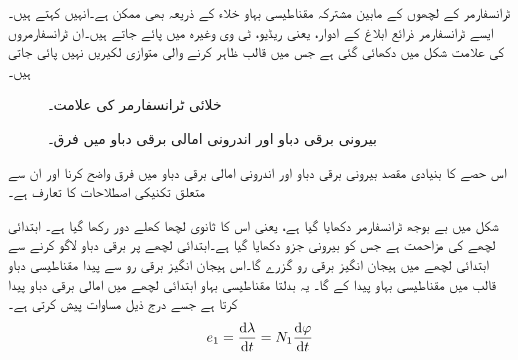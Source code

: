 ٹرانسفارمر کے لچھوں کے مابین مشترکہ مقناطیسی بہاو خلاء کے ذریعہ بھی ممکن ہے۔انہیں   کہتے ہیں۔ ایسے ٹرانسفارمر ذرائع ابلاغ کے ادوار، یعنی ریڈیو، ٹی وی وغیرہ میں پائے جاتے ہیں۔ان ٹرانسفارمروں کی علامت  شکل  میں دکھائی گئی ہے  جس میں  قالب ظاہر کرنے والی متوازی لکیریں نہیں پائی جاتی ہیں۔
\begin{figure}
\centering
\begin{minipage}{0.30\textwidth}
\centering
{}
\caption{خلائی ٹرانسفارمر کی علامت۔}
\label{شکل_ٹرانسفارمر_خلائی_قالب_علامت}
\end{minipage}%
\begin{minipage}{0.60\textwidth}
\centering
\caption{بیرونی برقی دباو اور اندرونی امالی برقی دباو میں فرق۔}
\label{شکل_ٹرانسفارمر_بیرونی_اور_اندرونی_برقی_دباو}
\end{minipage}
\end{figure}


اس حصے کا بنیادی مقصد بیرونی برقی دباو   اور اندرونی امالی برقی دباو   میں فرق واضح کرنا اور ان سے متعلق  تکنیکی اصطلاحات کا تعارف  ہے۔

شکل   میں بے بوجھ ٹرانسفارمر دکھایا گیا ہے، یعنی اس کا ثانوی لچھا  کھلے دور رکھا گیا ہے۔ ابتدائی لچھے کی مزاحمت  ہے جس کو بیرونی جزو دکھایا گیا ہے۔ابتدائی لچھے پر  برقی دباو لاگو کرنے سے ابتدائی لچھے میں ہیجان انگیز برقی رو  گزرے گا۔اس ہیجان انگیز برقی رو سے پیدا مقناطیسی دباو   قالب میں مقناطیسی بہاو   پیدا کے گا۔ یہ بدلتا مقناطیسی بہاو ابتدائی لچھے میں امالی برقی  دباو   پیدا کرتا ہے جسے درج ذیل مساوات پیش کرتی ہے۔
\begin{align}
e_1=\frac{\dif \lambda}{\dif t}=N_1 \frac{\dif \varphi}{\dif t}
\end{align}

